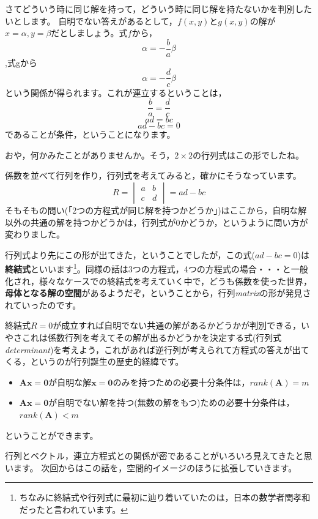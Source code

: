 \documentclass{ltjsbook}
\begin{document}
さてどういう時に同じ解を持って，どういう時に同じ解を持たないかを判別したいとします。
自明でない答えがあるとして，$f(x,y)$と$g(x,y)$の解が$x = \alpha,y=\beta$だとしましょう。式$f$から，
\[  \alpha = \displaystyle{-\frac{b}{a}}\beta \]
,式gから
\[ \alpha = \displaystyle{-\frac{d}{c} }\beta \]
という関係が得られます。これが連立するということは，
\[ \frac{b}{a} = \frac{d}{c} \]
\[ ad = bc \]
\[ ad - bc = 0 \]
であることが条件，ということになります。

おや，何かみたことがありませんか。そう，$2 \times 2$の行列式はこの形でしたね。

係数を並べて行列を作り，行列式を考えてみると，確かにそうなっています。
\[ R=\begin{vmatrix} a & b \\ c & d \end{vmatrix} = ad - bc \]
そもそもの問い(「2つの方程式が同じ解を持つかどうか」)はここから，自明な解以外の共通の解を持つかどうかは，行列式が0かどうか，というように問い方が変わりました。

行列式より先にこの形が出てきた，ということでしたが，この式($ad-bc=0$)は\textbf{終結式}といいます\footnote{ちなみに終結式や行列式に最初に辿り着いていたのは，日本の数学者関孝和だったと言われています。}。同様の話は3つの方程式，4つの方程式の場合・・・と一般化され，様々なケースでの終結式を考えていく中で，どうも係数を使った世界，\textbf{母体となる解の空間}があるようだぞ，ということから，行列\textit{matrix}の形が発見されていったのです。

終結式$R=0$が成立すれば自明でない共通の解があるかどうかが判別できる，いやさこれは係数行列を考えてその解が出るかどうかを決定する式(行列式\textit{determinant})を考えよう，これがあれば逆行列が考えられて方程式の答えが出てくる，というのが行列誕生の歴史的経緯です。
\label{doujiRenrituIchiji}
\begin{itemize}
	\item $\bm{Ax}=\bm{0}$が自明な解$\bm{x}=\bm{0}$のみを持つための必要十分条件は，$rank(\bm{A})=m$
	\item $\bm{Ax}=\bm{0}$が自明でない解を持つ(無数の解をもつ)ための必要十分条件は，$rank(\bm{A})<m$
\end{itemize}
ということができます。


\vspace{2cm}
行列とベクトル，連立方程式との関係が密であることがいろいろ見えてきたと思います。
次回からはこの話を，空間的イメージのほうに拡張していきます。
\end{document}

